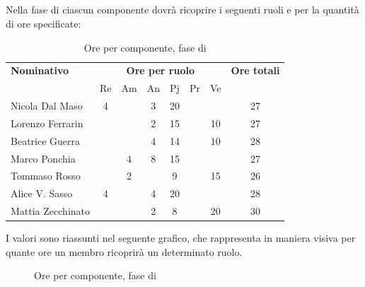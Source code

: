 \subsection{\PA}
Nella fase di \PA{} ciascun componente dovrà ricoprire i seguenti ruoli e per la quantità di ore specificate:

\begin{table}[H]
	\centering
	\begin{tabular}{|l|c|c|c|c|c|c|c|}
		\hline
		\textbf{Nominativo} & 
		\multicolumn{6}{c|}{\textbf{Ore per ruolo}} & 
		\textbf{Ore totali} \\
		& Re & Am & An & Pj & Pr & Ve & \\
		\hline
		Nicola Dal Maso &4 & &3 &20 & & & 27 \\
		Lorenzo Ferrarin & & &2 &15 & &10 & 27 \\
		Beatrice Guerra & & &4 &14 & &10 & 28 \\
		Marco Ponchia & &4 &8 &15 & & & 27 \\
		Tommaso Rosso & &2 & &9 & &15 & 26 \\
		Alice V. Sasso &4 & &4 &20 & & & 28 \\
		Mattia Zecchinato & & &2 &8 & &20 & 30 \\
		\hline
	\end{tabular}
	\caption{Ore per componente, fase di \PA}
\end{table}
I valori sono riassunti nel seguente grafico, che rappresenta in maniera visiva per quante ore un membro ricoprirà un determinato ruolo.
\begin{figure}[H]
	\centering
	\caption{Ore per componente, fase di \PA}
\end{figure}

